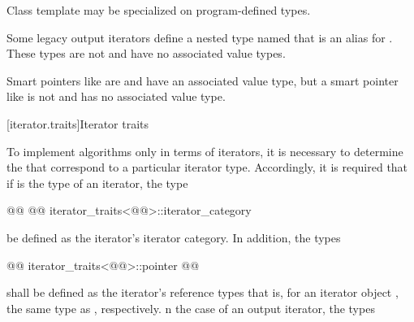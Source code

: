 \begin{addedblock}
\pnum
Class template  may be specialized
on program-defined types.

\pnum
\begin{note}
Some legacy output iterators define a nested type named 
that is an alias for . These types are not 
and have no associated value types.
\end{note}

\pnum
\begin{note}
Smart pointers like  are  and
have an associated value type, but a smart pointer like 
is not  and has no associated value type.
\end{note}
\end{addedblock}

[iterator.traits]{Iterator traits}

\pnum
{}%
To implement algorithms only in terms of iterators, it is 
necessary to determine the
 that
correspond to a particular iterator type. Accordingly,
it is required that if  is the type of an iterator,
the type

%
\begin{codeblock}
@@
@@
iterator_traits<@@>::iterator_category
\end{codeblock}

be defined as the iterator's  iterator category.
In addition, the types

%
%
\begin{codeblock}
@@
iterator_traits<@@>::pointer
@@
\end{codeblock}

shall be defined as the iterator's  reference  types\changed{,}{;} that is, for an
iterator object  , the same type as
,
respectively. n the case of an output iterator,
the types

